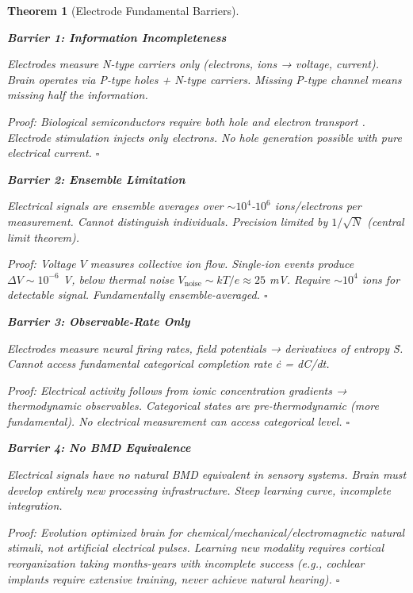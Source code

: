 \documentclass[11pt,a4paper]{article}
\newtheorem{theorem}{Theorem}[section]
\theoremstyle{definition}
\theoremstyle{remark}
\begin{document}
\begin{theorem}[Electrode Fundamental Barriers]
\label{thm:electrode_fail}

\textbf{Barrier 1: Information Incompleteness}

Electrodes measure N-type carriers only (electrons, ions → voltage, current). Brain operates via P-type holes + N-type carriers. Missing P-type channel means missing half the information.

\textit{Proof}: Biological semiconductors require both hole and electron transport \cite{Sachikonye2024}. Electrode stimulation injects only electrons. No hole generation possible with pure electrical current. $\square$

\textbf{Barrier 2: Ensemble Limitation}

Electrical signals are ensemble averages over $\sim 10^4$-$10^6$ ions/electrons per measurement. Cannot distinguish individuals. Precision limited by $1/\sqrt{N}$ (central limit theorem).

\textit{Proof}: Voltage $V$ measures collective ion flow. Single-ion events produce $\Delta V \sim 10^{-6}$ V, below thermal noise $V_{\text{noise}} \sim kT/e \approx 25$ mV. Require $\sim 10^4$ ions for detectable signal. Fundamentally ensemble-averaged. $\square$

\textbf{Barrier 3: Observable-Rate Only}

Electrodes measure neural firing rates, field potentials → derivatives of entropy Ṡ. Cannot access fundamental categorical completion rate ċ = dC/dt.

\textit{Proof}: Electrical activity follows from ionic concentration gradients → thermodynamic observables. Categorical states are pre-thermodynamic (more fundamental). No electrical measurement can access categorical level. $\square$

\textbf{Barrier 4: No BMD Equivalence}

Electrical signals have no natural BMD equivalent in sensory systems. Brain must develop entirely new processing infrastructure. Steep learning curve, incomplete integration.

\textit{Proof}: Evolution optimized brain for chemical/mechanical/electromagnetic natural stimuli, not artificial electrical pulses. Learning new modality requires cortical reorganization taking months-years with incomplete success (e.g., cochlear implants require extensive training, never achieve natural hearing). $\square$
\end{theorem}
\end{document}
